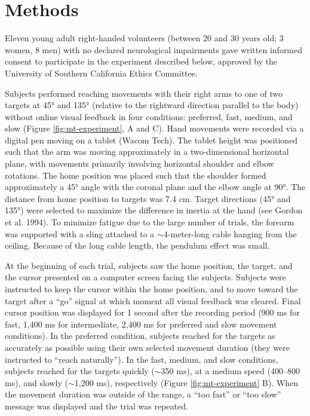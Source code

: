 \section{Methods}
Eleven young adult right-handed volunteers (between 20 and 30 years old; 3 women, 8 men) with no declared neurological impairments gave written informed consent to participate in the experiment described below, approved by the University of Southern California Ethics Committee.

Subjects performed reaching movements with their right arms to one of two targets at \ang{45} and \ang{135} (relative to the rightward direction parallel to the body) without online visual feedback in four conditions: preferred, fast, medium, and slow (Figure \ref{fig:mt-experiment}, A and C).  
Hand movements were recorded via a digital pen moving on a tablet (Wacom Tech). 
The tablet height was positioned such that the arm was moving approximately in a two-dimensional horizontal plane, with movements primarily involving horizontal shoulder and elbow rotations. 
The home position was placed such that the shoulder formed approximately a \ang{45} angle with the coronal plane and the elbow angle at \ang{90}. 
The distance from home position to targets was 7.4 cm. 
Target directions (\ang{45} and \ang{135}) were selected to maximize the difference in inertia at the hand (see Gordon et al. 1994). 
To minimize fatigue due to the large number of trials, the forearm was supported with a sling attached to a $\sim$4-meter-long cable hanging from the ceiling. 
Because of the long cable length, the pendulum effect was small.

At the beginning of each trial, subjects saw the home position, the target, and the cursor presented on a computer screen facing the subjects. 
Subjects were instructed to keep the cursor within the home position, and to move toward the target after a “go” signal at which moment all visual feedback was cleared. 
Final cursor position was displayed for 1 second after the recording period (900 ms for fast, 1,400 ms for intermediate, 2,400 ms for preferred and slow movement conditions). 
In the preferred condition, subjects reached for the targets as accurately as possible using their own selected movement duration (they were instructed to “reach naturally”). 
In the fast, medium, and slow conditions, subjects reached for the targets quickly ($\sim$350 ms), at a medium speed (400--800 ms), and slowly ($\sim$1,200 ms), respectively (Figure \ref{fig:mt-experiment} B). 
When the movement duration was outside of the range, a “too fast” or “too slow” message was displayed and the trial was repeated.
 
